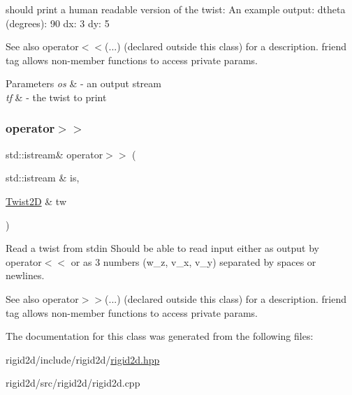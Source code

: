 should print a human readable version of the twist\+: An example output\+: dtheta (degrees)\+: 90 dx\+: 3 dy\+: 5 

\begin{DoxySeeAlso}{See also}
operator$<$$<$(...) (declared outside this class) for a description. friend tag allows non-\/member functions to access private params.
\end{DoxySeeAlso}

\begin{DoxyParams}{Parameters}
{\em os} & -\/ an output stream \\
\hline
{\em tf} & -\/ the twist to print \\
\hline
\end{DoxyParams}
\mbox{\label{classrigid2d_1_1Twist2D_a123979c39440643723bcd0e3e04812df}} 
\subsubsection{\texorpdfstring{operator$>$$>$}{operator>>}}
{\footnotesize\ttfamily std\+::istream\& operator$>$$>$ (\begin{DoxyParamCaption}\item[{std\+::istream \&}]{is,  }\item[{\hyperlink{classrigid2d_1_1Twist2D}{Twist2D} \&}]{tw }\end{DoxyParamCaption})\hspace{0.3cm}{\ttfamily [friend]}}



Read a twist from stdin Should be able to read input either as output by operator$<$$<$ or as 3 numbers (w\+\_\+z, v\+\_\+x, v\+\_\+y) separated by spaces or newlines. 

\begin{DoxySeeAlso}{See also}
operator$>$$>$(...) (declared outside this class) for a description. friend tag allows non-\/member functions to access private params. 
\end{DoxySeeAlso}


The documentation for this class was generated from the following files\+:\begin{DoxyCompactItemize}
\item 
rigid2d/include/rigid2d/\hyperlink{rigid2d_8hpp}{rigid2d.\+hpp}\item 
rigid2d/src/rigid2d/rigid2d.\+cpp\end{DoxyCompactItemize}
